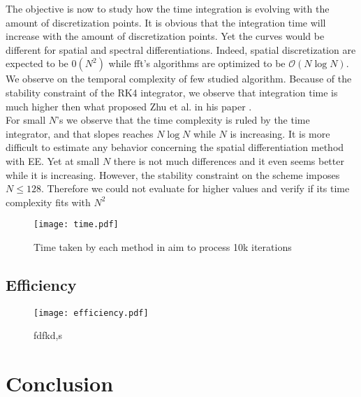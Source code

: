 \documentclass[10pt,a4paper,twocolumn]{article}
\begin{document}
The objective is now to study how the time integration is evolving with the amount of discretization points. It is obvious that the integration time will increase with the amount of discretization points. Yet the curves would be different for spatial and spectral differentiations. Indeed, spatial discretization are expected to be $\mathcal{0}(N^2)$ while fft's algorithms are optimized to be $\mathcal{O}(N \log N)$. We observe on  the temporal complexity of few studied algorithm. Because of the stability constraint of the RK4 integrator, we observe that integration time is much higher then what proposed Zhu et al. in his paper \cite{zhu_1999}.
\vspace{\baselineskip}\\
For small $N$'s we observe that the time complexity is ruled by the time integrator, and that slopes reaches $N\log N$ while $N$ is increasing. It is more difficult to estimate any behavior concerning the spatial differentiation method with EE. Yet at small $N$ there is not much differences and it even seems better while it is increasing. However, the stability constraint on the scheme imposes $N\leq128$. Therefore we could not evaluate for higher values and verify if its time complexity fits with $N^2$
\begin{figure}
	\texttt{[image: time.pdf]}
	\caption{Time taken by each method in aim to process 10k iterations}
	\label{fig:temporal_complexity}
\end{figure}

\subsection{Efficiency} %
\label{sub:efficiency}

\begin{figure}
	\texttt{[image: efficiency.pdf]}
	\caption{fdfkd,s}
	\label{fig:efficiency}
\end{figure}


\section{Conclusion} %
\label{sec:conclusion}




\end{document}
